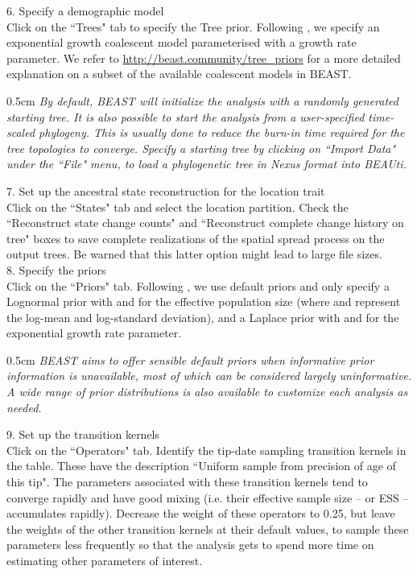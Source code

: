 \documentclass{article}
\newcommand{\ann}[1]{
\begin{adjustwidth}{0.5cm}{}
\it{#1}\\
\end{adjustwidth}}
\newcommand{\code}[1]{
{\upshape\ttfamily{#1}}}
\begin{document}
6. Specify a demographic model\\

Click on the ``Trees" tab to specify the Tree prior. Following \cite{travhist}, we specify an exponential growth coalescent model parameterised with a growth rate parameter.
We refer to \url{http://beast.community/tree_priors} for a more detailed explanation on a subset of the available coalescent models in BEAST. \\

\ann{By default, BEAST will initialize the analysis with a randomly generated starting tree. It is also possible to start the analysis from a user-specified time-scaled phylogeny. This is usually done to reduce the burn-in time required for the tree topologies to converge. Specify a starting tree by clicking on ``Import Data" under the ``File" menu, to load a phylogenetic tree in Nexus format into BEAUti.}

7. Set up the ancestral state reconstruction for the location trait\\

Click on the ``States" tab and select the location partition.
Check the ``Reconstruct state change counts" and ``Reconstruct complete change history on tree" boxes to save complete realizations of the spatial spread process on the output trees.
Be warned that this latter option might lead to large file sizes.\\

8. Specify the priors \\

Click on the ``Priors" tab. Following \cite{travhist}, we use default priors and only specify a Lognormal prior with\code{mu=1} and\code{sigma=10} for the effective population size (where\code{mu} and \code{sigma} represent the log-mean and log-standard deviation), and a Laplace prior with\code{mean=0} and\code{scale=100} for the exponential growth rate parameter.\\

\ann{BEAST aims to offer sensible default priors when informative prior information is unavailable, most of which can be considered largely uninformative. A wide range of prior distributions is also available to customize each analysis as needed.}

9. Set up the transition kernels \\

Click on the ``Operators" tab. Identify the tip-date sampling transition kernels in the table.
These have the description ``Uniform sample from precision of age of this tip".
The parameters associated with these transition kernels tend to converge rapidly and have good mixing (i.e. their effective sample size -- or ESS -- accumulates rapidly).
Decrease the weight of these operators to 0.25, but leave the weights of the other transition kernels at their default values, to sample these parameters less frequently so that the analysis gets to spend more time on estimating other parameters of interest.\\
\end{document}
